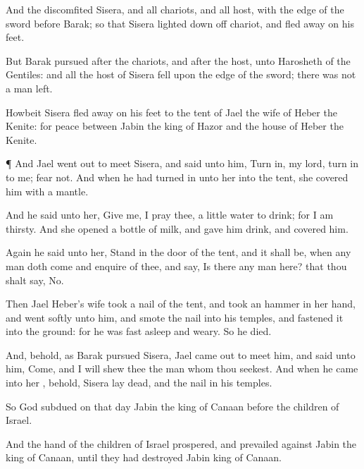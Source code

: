 {And the
{}
discomfited
Sisera, and all
{}
chariots, and all
{}
host, with the
edge of the
sword
before
Barak; so that
Sisera lighted
down off
{}
chariot, and fled
away on his
feet.

But
Barak
pursued
after the
chariots, and after the
host, unto
Harosheth of the
Gentiles: and all the
host of
Sisera
fell upon the
edge of the
sword;
{} there was not a
man
left.


\par }{\PP {}Howbeit
Sisera fled
away on his
feet to the
tent of
Jael the
wife of
Heber the
Kenite: for
{}
peace between
Jabin the
king of
Hazor and the
house of
Heber the
Kenite.


\par }{\PP {}¶ And
Jael went
out to
meet
Sisera, and
said unto him, Turn
in, my
lord, turn
in to me;
fear not. And when he had turned
in unto her into the
tent, she
covered him with a
mantle.

And he
said unto her, Give me, I pray thee, a
little
water to
drink; for I am
thirsty. And she
opened a
bottle of
milk, and gave him
drink, and
covered him.

Again he
said unto her, Stand
in the
door of the
tent, and it shall be, when any
man doth
come and
enquire of thee, and
say, Is
there any
man
here? that thou shalt
say, No.

Then
Jael
Heber’s
wife
took a
nail of the
tent, and
took an
hammer in her
hand, and
went
softly unto him, and
smote the
nail into his
temples, and
fastened it into the
ground: for he was fast
asleep and
weary. So he
died.

And, behold, as
Barak
pursued
Sisera,
Jael came
out to
meet him, and
said unto him,
Come, and I will
shew thee the
man whom thou
seekest. And when he
came into her
{}, behold,
Sisera
lay
dead, and the
nail
{} in his
temples.

So
God
subdued on that
day
Jabin the
king of
Canaan
before the
children of
Israel.

And the
hand of the
children of
Israel
prospered, and
prevailed against
Jabin the
king of
Canaan, until they had
destroyed
Jabin
king of
Canaan.




}
